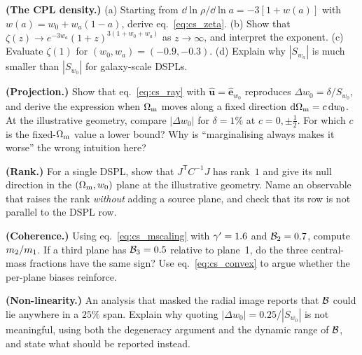 \begin{exercise}
\label{ex:cs_cpl}
\textbf{(The CPL density.)}
(a) Starting from $\dd\ln\rho/\dd\ln a=-3[1+w(a)]$ with
$w(a)=w_0+w_a(1-a)$, derive eq.~\eqref{eq:cs_zeta}.
(b) Show that $\zeta(z)\to e^{-3w_a}(1+z)^{3(1+w_0+w_a)}$ as
$z\to\infty$, and interpret the exponent.
(c) Evaluate $\zeta(1)$ for $(w_0,w_a)=(-0.9,-0.3)$.
(d) Explain why $|S_{w_a}|$ is much smaller than $|S_{w_0}|$ for
galaxy-scale DSPLs.
\end{exercise}

\begin{exercise}
\label{ex:cs_projection}
\textbf{(Projection.)}
Show that eq.~\eqref{eq:cs_ray} with $\hat{\bm{u}}=\hat{\bm{e}}_{w_0}$
reproduces $\Delta w_0=\delta/S_{w_0}$, and derive the expression when
$\Omega_{\mathrm{m}}$ moves along a fixed direction $\dd\Omega_{\mathrm{m}}=c\,\dd w_0$. At the
illustrative geometry, compare $|\Delta w_0|$ for $\delta=1\%$ at
$c=0,\pm\tfrac12$. For which $c$ is the fixed-$\Omega_{\mathrm{m}}$ value a lower
bound? Why is ``marginalising always makes it worse'' the wrong
intuition here?
\end{exercise}

\begin{exercise}
\label{ex:cs_rank}
\textbf{(Rank.)}
For a single DSPL, show that $J^{\mathsf T}C^{-1}J$ has rank~$1$ and give
its null direction in the $(\Omega_{\mathrm{m}},w_0)$ plane at the illustrative
geometry. Name an observable that raises the rank \emph{without} adding a
source plane, and check that its row is not parallel to the DSPL row.
\end{exercise}

\begin{exercise}
\label{ex:cs_coherence}
\textbf{(Coherence.)}
Using eq.~\eqref{eq:cs_mscaling} with $\gamma'=1.6$ and $\mathcal{B}_2=0.7$,
compute $m_2/m_1$. If a third plane has $\mathcal{B}_3=0.5$ relative to
plane~1, do the three central-mass fractions have the same sign? Use
eq.~\eqref{eq:cs_convex} to argue whether the per-plane biases reinforce.
\end{exercise}

\begin{exercise}
\label{ex:cs_nonlinear}
\textbf{(Non-linearity.)}
An analysis that masked the radial image reports that $\mathcal{B}$ could lie
anywhere in a $25\%$ span. Explain why quoting
$|\Delta w_0|=0.25/|S_{w_0}|$ is not meaningful, using both the
degeneracy argument and the dynamic range of $\mathcal{B}$, and state what
should be reported instead.
\end{exercise}

